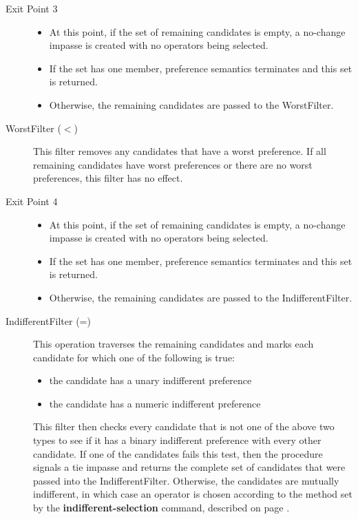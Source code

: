 \begin{description}
	\item[Exit Point 3]
	\begin{itemize}
		\item At this point, if the set of remaining candidates is empty,
		a no-change impasse is created with no operators being selected.
		\item If  the set has one member, preference semantics terminates 
		and this set is returned.
		\item Otherwise, the remaining candidates are passed to the
		WorstFilter.
	\end{itemize}
	\index{-}
	
	\item[WorstFilter ($<$) ] This filter removes any candidates that have
	a worst preference. If all remaining candidates have worst preferences or there
	are no worst preferences, this filter has no effect.
	
	\item[Exit Point 4]
	\begin{itemize}
		\item At this point, if the set of remaining candidates is empty,
		a no-change impasse is created with no operators being selected. 
		\item If the set has one member, preference semantics terminates 
		and this set is returned.
		\item Otherwise, the remaining candidates are passed to the
		IndifferentFilter.
	\end{itemize}
	\index{-}
	
	\index{=}
	\item[IndifferentFilter (=) ] This operation traverses the remaining candidates and marks 
	each candidate for which one of the following is true:
	\begin{itemize}
		\item the candidate has a unary indifferent preference
		\item the candidate has a numeric indifferent preference
	\end{itemize}
	This filter then checks every candidate that is not one of the above two types
	to see if it has a binary indifferent preference with every other candidate.
	If one of the candidates fails this test, then the procedure signals a tie impasse
	and returns the complete set of candidates that were passed into the 
	IndifferentFilter. Otherwise, the candidates are mutually indifferent, in which case 
	an operator is chosen according to the method set by the 
	\textbf{indifferent-selection} command, described on 
	page \pageref{decide-indifferent-selection}.
\end{description}

